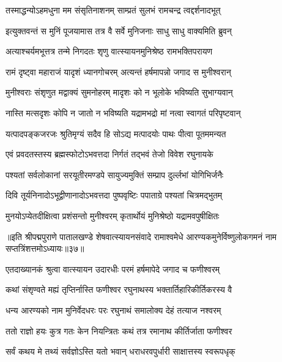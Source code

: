 \twolineshloka
{तस्माद्धन्योऽहमधुना मम संसृतिनाशनम्}
{साम्प्रतं सुलभं रामचन्द्र त्वद्दर्शनादभूत्}%

\twolineshloka
{इत्युक्तवन्तं स मुनिं पूजयामास तत्र वै}
{सर्वे मुनिजनाः साधु साधु वाक्यमिति ब्रुवन्}%


\twolineshloka
{अत्याश्चर्यमभूत्तत्र तन्मे निगदतः शृणु}
{वात्स्यायनमुनिश्रेष्ठ रामभक्तिपरायण}%

\twolineshloka
{रामं दृष्ट्वा महाराजं यादृशं ध्यानगोचरम्}
{अत्यन्तं हर्षमापन्नो जगाद स मुनीश्वरान्}%

\twolineshloka
{मुनीश्वराः संशृणुत मद्वाक्यं सुमनोहरम्}
{मादृशः को न भूलोके भविष्यति सुभाग्यवान्}%

\twolineshloka
{नास्ति मत्सदृशः कोपि न जातो न भविष्यति}
{यद्रामभद्रो मां नत्वा स्वागतं परिपृष्टवान्}%

\twolineshloka
{यत्पादपङ्कजरजः श्रुतिमृग्यं सदैव हि}
{सोऽद्य मत्पादयोः पाथः पीत्वा पूतममन्यत}%

\twolineshloka
{एवं प्रवदतस्तस्य ब्रह्मस्फोटोऽभवत्तदा}
{निर्गतं तद्भवं तेजो विवेश रघुनायके}%

\twolineshloka
{पश्यतां सर्वलोकानां सरयूतीरमण्डपे}
{सायुज्यमुक्तिं सम्प्राप दुर्ल्लभां योगिभिर्जनैः}%

\twolineshloka
{दिवि तूर्यनिनादोऽभूद्वीणानादोऽभवत्तदा}
{पुष्पवृष्टिः पपाताग्रे पश्यतां चित्रमद्भुतम्}%

\twolineshloka
{मुनयोऽप्येतदीक्षित्वा प्रशंसन्तो मुनीश्वरम्}
{कृतार्थोयं मुनिश्रेष्ठो यद्रामवपुषीक्षितः}%

{॥इति श्रीपद्मपुराणे पातालखण्डे शेषवात्स्यायनसंवादे रामाश्वमेधे आरण्यकमुनेर्विष्णुलोकगमनं नाम सप्तत्रिंशत्तमोऽध्यायः॥३७॥}



\twolineshloka
{एतदाख्यानकं श्रुत्वा वात्स्यायन उदारधीः}
{परमं हर्षमापेदे जगाद च फणीश्वरम्}%


\twolineshloka
{कथां संशृण्वते मह्यं तृप्तिर्नास्ति फणीश्वर}
{रघुनाथस्य भक्तार्तिहारिकीर्तिकरस्य वै}%

\twolineshloka
{धन्य आरण्यको नाम मुनिर्वेदधरः परः}
{रघुनाथं समालोक्य देहं तत्याज नश्वरम्}%

\twolineshloka
{ततो राज्ञो हयः कुत्र गतः केन नियन्त्रितः}
{कथं तत्र रमानाथ कीर्तिर्जाता फणीश्वर}%

\twolineshloka
{सर्वं कथय मे तथ्यं सर्वज्ञोऽस्ति यतो भवान्}
{धराधरवपुर्धारी साक्षात्तस्य स्वरूपधृक्}%

